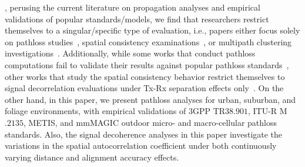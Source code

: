 \documentclass[10pt, twocolumn]{IEEEtran}
\begin{document}
, perusing the current literature on propagation analyses and empirical validations of popular standards/models, we find that researchers restrict themselves to a singular/specific type of evaluation, i.e., papers either focus solely on pathloss studies~\cite{Qualcomm3GPP, MacCartneyModelsOverview, FoliageSimulations, SuburbanGeometryJournal}, spatial consistency examinations~\cite{SpatialConsistencyOriginal}, or multipath clustering investigations~\cite{QDC_NIST, D2DHumanBlockage}. Additionally, while some works that conduct pathloss computations fail to validate their results against popular pathloss standards~\cite{FoliageSimulations, SuburbanGeometryJournal}, other works that study the spatial consistency behavior restrict themselves to signal decorrelation evaluations under Tx-Rx separation effects only~\cite{SpatialConsistencyOriginal, MacCartneyRural, SpatialDynamics}. On the other hand, in this paper, we present pathloss analyses for urban, suburban, and foliage environments, with empirical validations of $3$GPP TR$38.901$, ITU-R M$.2135$, METIS, and mmMAGIC outdoor micro- and macro-cellular pathloss standards. Also, the signal decoherence analyses in this paper investigate the variations in the spatial autocorrelation coefficient under both continuously varying distance and alignment accuracy effects.\\
\end{document}
